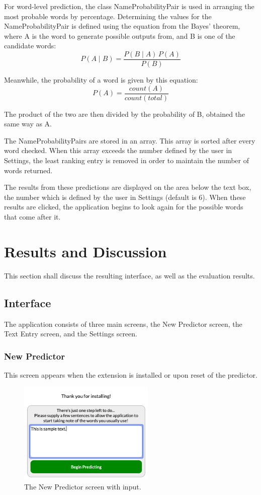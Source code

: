 \documentclass[journal]{./IEEE/IEEEtran}
\begin{document}
For word-level prediction, the class NameProbabilityPair is used in arranging the most probable words by percentage. Determining the values for the NameProbabilityPair is defined using the equation from the Bayes' theorem, where A is the word to generate possible outputs from, and B is one of the candidate words:
$$ P(A \mid B) = \frac{P(B \mid A) \, P(A)}{P(B)} $$

Meanwhile, the probability of a word is given by this equation:
$$ P(A) = \frac{count(A)}{count(total)} $$

The product of the two are then divided by the probability of B, obtained the same way as A.

The NameProbabilityPairs are stored in an array. This array is sorted after every word checked. When this array exceeds the number defined by the user in Settings, the least ranking entry is removed in order to maintain the number of words returned.

The results from these predictions are displayed on the area below the text box, the number which is defined by the user in Settings (default is 6). When these results are clicked, the application begins to look again for the possible words that come after it.

\section{Results and Discussion}
This section shall discuss the resulting interface, as well as the evaluation results.

\subsection{Interface}
The application consists of three main screens, the New Predictor screen, the Text Entry screen, and the Settings screen.

\subsubsection{New Predictor}
This screen appears when the extension is installed or upon reset of the predictor.

\begin{figure}[!ht]
\begin{center}

\includegraphics[width=65mm]{images/initial-input.png}
\caption{The New Predictor screen with input.}

\end{center}
\end{figure}
\end{document}
